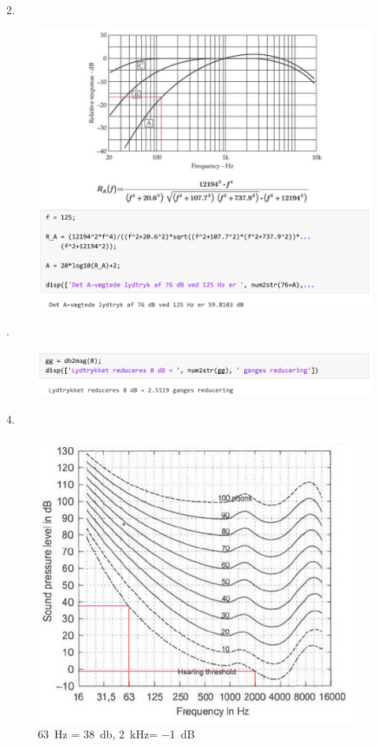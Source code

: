 2.
\begin{figure} [H]
	\includegraphics[width=\linewidth]{graphics/37.png}
\end{figure}

.
\begin{figure} [H]
	\includegraphics[width=\linewidth]{graphics/38.png}
\end{figure}

4.
\begin{figure} [H]
	\centering
	\includegraphics[width=0.7\linewidth]{graphics/39.png}
	\caption{\SI{63}{\hertz} = \SI{38}{\decibel}, \SI{2}{\kilo\hertz}= \SI{-1}{\deci\bel}}
	\label{fig:39}
\end{figure}


